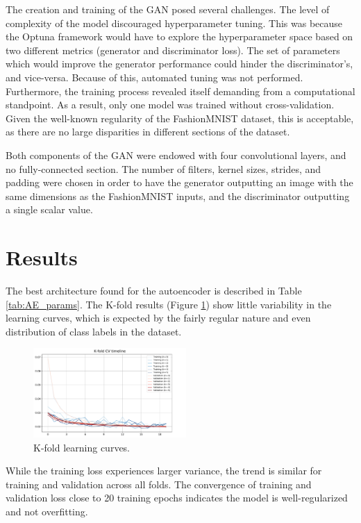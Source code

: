 \documentclass[11pt]{article} %
\begin{document}
\noindent The creation and training of the GAN posed several challenges. The level of complexity of the model discouraged hyperparameter tuning. This was because the Optuna framework would have to explore the hyperparameter space based on two different metrics (generator and discriminator loss). The set of parameters which would improve the generator performance could hinder the discriminator's, and vice-versa. Because of this, automated tuning was not performed. Furthermore, the training process revealed itself demanding from a computational standpoint. As a result, only one model was trained without cross-validation. Given the well-known regularity of the FashionMNIST dataset, this is acceptable, as there are no large disparities in different sections of the dataset.

\noindent Both components of the GAN were endowed with four convolutional layers, and no fully-connected section. The number of filters, kernel sizes, strides, and padding were chosen in order to have the generator outputting an image with the same dimensions as the FashionMNIST inputs, and the discriminator outputting a single scalar value.

\section*{Results}



\noindent The best architecture found for the autoencoder is described in Table \ref{tab:AE_params}. The K-fold results (Figure \ref{fig:kfold}) show little variability in the learning curves, which is expected by the fairly regular nature and even distribution of class labels in the dataset. 

\begin{figure}
    \centering
    \includegraphics[width=0.52\textwidth]{res/learning_curve_KFCV.pdf}
    \caption{K-fold learning curves.}
    \label{fig:kfold}
\end{figure}

While the training loss experiences larger variance, the trend is similar for training and validation across all folds. The convergence of training and validation loss close to 20 training epochs indicates the model is well-regularized and not overfitting.
\end{document}
